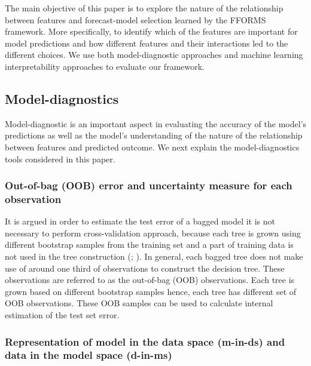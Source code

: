 \documentclass[11pt,a4paper,]{article}
\begin{document}
The main objective of this paper is to explore the nature of the
relationship between features and forecast-model selection learned by
the FFORMS framework. More specifically, to identify which of the
features are important for model predictions and how different features
and their interactions led to the different choices. We use both
model-diagnostic approaches and machine learning interpretability
approaches to evaluate our framework.

\subsection{Model-diagnostics}\label{model-diagnostics}

Model-diagnostic is an important aspect in evaluating the accuracy of
the model's predictions as well as the model's understanding of the
nature of the relationship between features and predicted outcome. We
next explain the model-diagnostics tools considered in this paper.

\subsubsection{Out-of-bag (OOB) error and uncertainty measure for each
observation}\label{out-of-bag-oob-error-and-uncertainty-measure-for-each-observation}

It is argued in order to estimate the test error of a bagged model it is
not necessary to perform cross-validation approach, because each tree is
grown using different bootstrap samples from the training set and a part
of training data is not used in the tree construction
(\textcite{breiman2001random}; \textcite{chen2004using}). In general,
each bagged tree does not make use of around one third of observations
to construct the decision tree. These observations are referred to as
the out-of-bag (OOB) observations. Each tree is grown based on different
bootstrap samples hence, each tree has different set of OOB
observations. These OOB samples can be used to calculate internal
estimation of the test set error.

\subsubsection{Representation of model in the data space (m-in-ds) and
data in the model space
(d-in-ms)}\label{representation-of-model-in-the-data-space-m-in-ds-and-data-in-the-model-space-d-in-ms}
\end{document}
